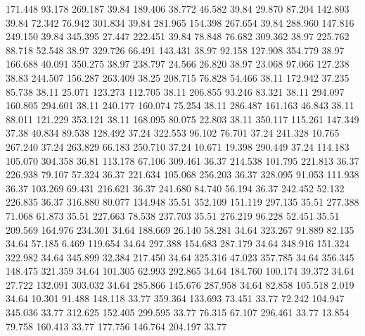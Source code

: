  171.448   93.178  269.187        39.84
 189.406   38.772   46.582        39.84
  29.870   87.204  142.803        39.84
  72.342   76.942  301.834        39.84
 281.965  154.398  267.654        39.84
 288.960  147.816  249.150        39.84
 345.395   27.447  222.451        39.84
  78.848   76.682  309.362        38.97
 225.762   88.718   52.548        38.97
 329.726   66.491  143.431        38.97
  92.158  127.908  354.779        38.97
 166.688   40.091  350.275        38.97
 238.797   24.566   26.820        38.97
  23.068   97.066  127.238        38.83
 244.507  156.287  263.409        38.25
 208.715   76.828   54.466        38.11
 172.942   37.235   85.738        38.11
  25.071  123.273  112.705        38.11
 206.855   93.246   83.321        38.11
 294.097  160.805  294.601        38.11
 240.177  160.074   75.254        38.11
 286.487  161.163   46.843        38.11
  88.011  121.229  353.121        38.11
 168.095   80.075   22.803        38.11
 350.117  115.261  147.349        37.38
  40.834   89.538  128.492        37.24
 322.553   96.102   76.701        37.24
 241.328   10.765  267.240        37.24
 263.829   66.183  250.710        37.24
  10.671   19.398  290.449        37.24
 114.183  105.070  304.358        36.81
 113.178   67.106  309.461        36.37
 214.538  101.795  221.813        36.37
 226.938   79.107   57.324        36.37
 221.634  105.068  256.203        36.37
 328.095   91.053  111.938        36.37
 103.269   69.431  216.621        36.37
 241.680   84.740   56.194        36.37
 242.452   52.132  226.835        36.37
 316.880   80.077  134.948        35.51
 352.109  151.119  297.135        35.51
 277.388   71.068   61.873        35.51
 227.663   78.538  237.703        35.51
 276.219   96.228   52.451        35.51
 209.569  164.976  234.301        34.64
 188.669   26.140   58.281        34.64
 323.267   91.889   82.135        34.64
  57.185    6.469  119.654        34.64
 297.388  154.683  287.179        34.64
 348.916  151.324  322.982        34.64
 345.899   32.384  217.450        34.64
 325.316   47.023  357.785        34.64
 356.345  148.475  321.359        34.64
 101.305   62.993  292.865        34.64
 184.760  100.174   39.372        34.64
  27.722  132.091  303.032        34.64
 285.866  145.676  287.958        34.64
  82.858  105.518    2.019        34.64
  10.301   91.488  148.118        33.77
 359.364  133.693   73.451        33.77
  72.242  104.947  345.036        33.77
 312.625  152.405  299.595        33.77
  76.315   67.107  296.461        33.77
  13.854   79.758  160.413        33.77
 177.756  146.764  204.197        33.77
